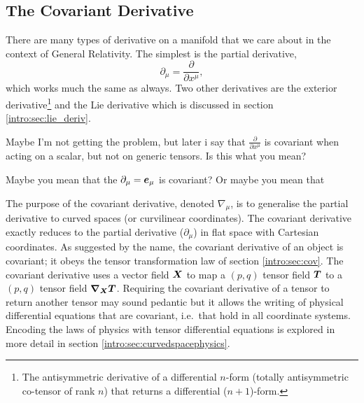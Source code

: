 \subsection{The Covariant Derivative}\label{intro:sec:covariant_derivative}

There are many types of derivative on a manifold that we care about in the context of General Relativity. The simplest is the partial derivative,
\begin{equation}
\partial_\mu = \frac{\partial}{\partial x^\mu},
\end{equation}
which works much the same as always. Two other derivatives are the exterior derivative\footnote{The antisymmetric derivative of a differential $n$-form (totally antisymmetric co-tensor of rank $n$) that returns a differential ($n+1$)-form. } and the Lie derivative which is discussed in section \ref{intro:sec:lie_deriv}.

\color{choral} Maybe I'm not getting the problem, but later i say that $\frac{\partial}{\partial x^\mu}$ is covariant when acting on a scalar, but not on generic tensors. Is this what you mean? \color{black}

\color{choral} Maybe you mean that the $\partial_\mu = \boldsymbol{e}_\mu$ is covariant? Or maybe you mean that \color{black}

The purpose of the covariant derivative, denoted $\nabla_\mu$, is to generalise the partial derivative to curved spaces (or curvilinear coordinates). The covariant derivative exactly reduces to the partial derivative ($\partial_\mu$) in flat space with Cartesian coordinates. As suggested by the name, the covariant derivative of an object is covariant; it obeys the tensor transformation law of section \ref{intro:sec:cov}. The covariant derivative uses a vector field $\boldsymbol{X}$ to map a $(p,q)$ tensor field $\boldsymbol{T}$ to
 a $(p,q)$ tensor field ${\boldsymbol{\nabla}_{\boldsymbol{X}}} \boldsymbol{T}$. Requiring the covariant derivative of a tensor to return another tensor may sound pedantic but it allows the writing of physical differential equations that are covariant, i.e.~that hold in all coordinate systems. Encoding the laws of physics with tensor differential equations is explored in more detail in section \ref{intro:sec:curvedspacephysics}.

